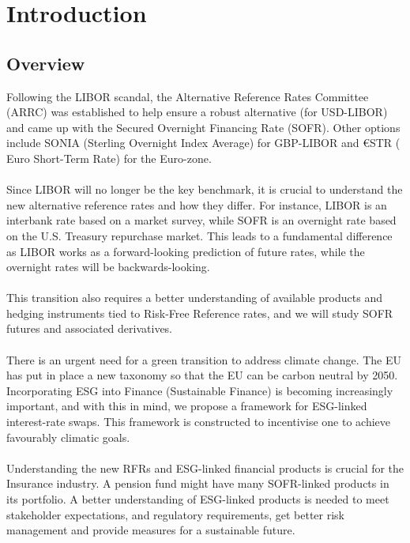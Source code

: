 \chapter{Introduction}
\label{intro}
\begin{comment}
The rest of the text is organised as follows. This is an example of a description list; see more lists in \cref{discussion} and \vref{tab14}.    
\end{comment}

\section{Overview}

Following the LIBOR scandal, the Alternative Reference Rates Committee (ARRC)  was established to help ensure a robust alternative (for USD-LIBOR) and came up with the Secured Overnight Financing Rate (SOFR). Other options include SONIA (Sterling Overnight Index Average) for GBP-LIBOR and €STR ( Euro Short-Term Rate) for the Euro-zone. 
\\~\\ 
Since LIBOR will no longer be the key benchmark, it is crucial to understand the new alternative reference rates and how they differ. For instance, LIBOR is an interbank rate based on a market survey, while SOFR is an overnight rate based on the U.S. Treasury repurchase market. This leads to a fundamental difference as LIBOR works as a forward-looking prediction of future rates, while the overnight rates will be backwards-looking.  
\\~\\ 
This transition also requires a better understanding of available products and hedging instruments tied to Risk-Free Reference rates, and we will study SOFR futures and associated derivatives.  
\\~\\
There is an urgent need for a green transition to address climate change. The EU has put in place a new taxonomy so that the EU can be carbon neutral by 2050. Incorporating ESG into Finance (Sustainable Finance) is becoming increasingly important, and with this in mind, we propose a framework for ESG-linked interest-rate swaps. This framework is constructed to incentivise one to achieve favourably climatic goals.
\\~\\ 
Understanding the new RFRs and ESG-linked financial products is crucial for the Insurance industry. A pension fund might have many SOFR-linked products in its portfolio. A better understanding of ESG-linked products is needed to meet stakeholder expectations, and regulatory requirements, get better risk management and provide measures for a sustainable future.   






